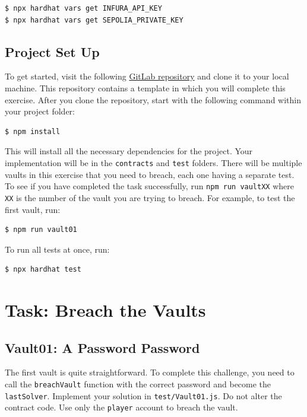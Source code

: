 \documentclass[12pt]{article}
\begin{document}
\begin{verbatim}
$ npx hardhat vars get INFURA_API_KEY
$ npx hardhat vars get SEPOLIA_PRIVATE_KEY
\end{verbatim}



\subsection*{Project Set Up}

To get started, visit the following \href{https://gitlab.fel.cvut.cz/radovluk/smart-contracts-exercises/-/tree/main/04-Unbreakable-Vault/task/task-code}{GitLab repository} and clone it to your local machine. This repository contains a template in which you will complete this exercise. After you clone the repository, start with the following command within your project folder:

\begin{verbatim}
$ npm install
\end{verbatim}
This will install all the necessary dependencies for the project. Your implementation will be in the \texttt{contracts} and \texttt{test} folders.
There will be multiple vaults in this exercise that you need to breach, each one having a separate test. To see if you have completed the task successfully, run \texttt{npm run vaultXX} where \texttt{XX} is the number of the vault you are trying to breach. For example, to test the first vault, run:
\begin{verbatim}
$ npm run vault01
\end{verbatim}
To run all tests at once, run:
\begin{verbatim}
$ npx hardhat test
\end{verbatim}

\section{Task: Breach the Vaults}
\subsection*{Vault01: A Password Password}
The first vault is quite straightforward. To complete this challenge, you need to call the \texttt{breachVault} function with the correct password and become the \texttt{lastSolver}. Implement your solution in \texttt{test/Vault01.js}. Do not alter the contract code. Use only the \texttt{player} account to breach the vault.
\end{document}

